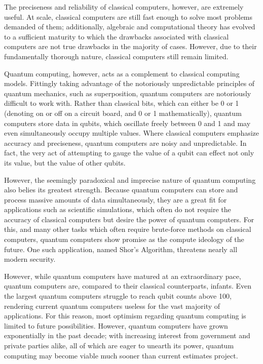\documentclass[a4paper]{article}
\begin{document}
The preciseness and reliability of classical computers, however, are
extremely useful. At scale, classical computers are still fast enough to
solve most problems demanded of them; additionally, algebraic and
computational theory has evolved to a sufficient maturity to which the
drawbacks associated with classical computers are not true drawbacks in
the majority of cases. However, due to their fundamentally thorough
nature, classical computers still remain limited.

Quantum computing, however, acts as a complement to classical computing
models. Fittingly taking advantage of the notoriously unpredictable
principles of quantum mechanics, such as superposition, quantum
computers are notoriously difficult to work with. Rather than classical
bits, which can either be 0 or 1 (denoting on or off on a circuit board,
and 0 or 1 mathematically), quantum computers store data in qubits,
which oscillate freely between 0 and 1 and may even simultaneously
occupy multiple values. Where classical computers emphasize accuracy and
preciseness, quantum computers are noisy and unpredictable. In fact, the
very act of attempting to gauge the value of a qubit can effect not only
its value, but the value of other qubits.

However, the seemingly paradoxical and imprecise nature of quantum
computing also belies its greatest strength. Because quantum computers
can store and process massive amounts of data simultaneously, they are a
great fit for applications such as scientific simulations, which often
do not require the accuracy of classical computers but desire the power
of quantum computers. For this, and many other tasks which often require
brute-force methods on classical computers, quantum computers show
promise as the compute ideology of the future. One such application,
named Shor's Algorithm, threatens nearly all modern security.

However, while quantum computers have matured at an extraordinary pace,
quantum computers are, compared to their classical counterparts,
infants. Even the largest quantum computers struggle to reach qubit
counts above 100, rendering current quantum computers useless for the
vast majority of applications. For this reason, most optimism regarding
quantum computing is limited to future possibilities. However, quantum
computers have grown exponentially in the past decade; with increasing
interest from government and private parties alike, all of which are
eager to unearth its power, quantum computing may become viable much
sooner than current estimates project.
\end{document}
